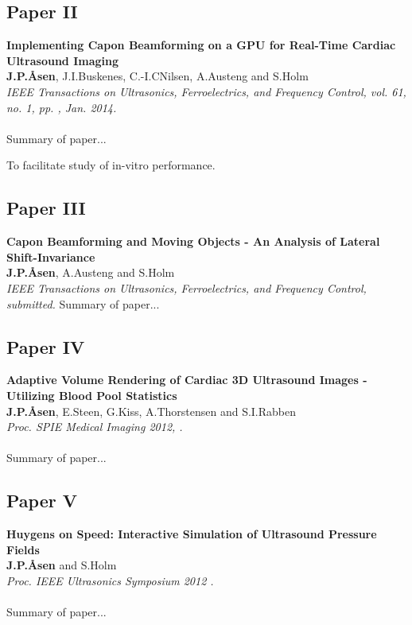 \subsection{Paper II}
\textbf{Implementing Capon Beamforming on a GPU for Real-Time Cardiac Ultrasound Imaging}\\
\textbf{J.\:P.\:\AA{}sen}, J.\:I.\:Buskenes, C.-I.\:C\:Nilsen, A.\:Austeng and S.\:Holm\\
{\it IEEE Transactions on Ultrasonics, Ferroelectrics, and Frequency Control, vol. 61, no. 1, pp. , Jan. 2014.}\\\\
Summary of paper...

To facilitate study of in-vitro performance.

\subsection{Paper III}
\textbf{Capon Beamforming and Moving Objects - An Analysis of Lateral Shift-Invariance}\\
\textbf{J.\:P.\:\AA{}sen}, A.\:Austeng and S.\:Holm\\
{\it IEEE Transactions on Ultrasonics, Ferroelectrics, and Frequency Control, submitted.}
Summary of paper...

\subsection{Paper IV}
\textbf{Adaptive Volume Rendering of Cardiac 3D Ultrasound Images - Utilizing Blood Pool Statistics}\\
\textbf{J.\:P.\:\AA{}sen}, E.\:Steen, G.\:Kiss, A.\:Thorstensen and S.\:I.\:Rabben\\
{\it Proc. SPIE Medical Imaging 2012, .}\\\\
Summary of paper...

\subsection{Paper V}
\textbf{Huygens on Speed: Interactive Simulation of Ultrasound Pressure Fields}\\
\textbf{J.\:P.\:\AA{}sen} and S.\:Holm\\
{\it Proc. IEEE Ultrasonics Symposium 2012 .}\\\\
Summary of paper...


